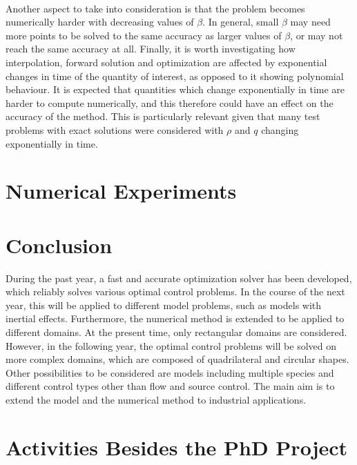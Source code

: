 \documentclass[11pt, a4paper]{article}
\theoremstyle{definition}
\newcommand{\adj}{q}
\begin{document}
\\
Another aspect to take into consideration is that the problem becomes numerically harder with decreasing values of $\beta$. In general, small $\beta$ may need more points to be solved to the same accuracy as larger values of $\beta$, or may not reach the same accuracy at all.  Finally, it is worth investigating how interpolation, forward solution and optimization are affected by exponential changes in time of the quantity of interest, as opposed to it showing polynomial behaviour. It is expected that quantities which change exponentially in time are harder to compute numerically, and this therefore could have an effect on the accuracy of the method. This is particularly relevant given that many test problems with exact solutions were considered with $\rho$ and $\adj$ changing exponentially in time.


\section{Numerical Experiments} \label{sec:Examples}



\section{Conclusion}
During the past year, a fast and accurate optimization solver has been developed, which reliably solves various optimal control problems. In the course of the next year, this will be applied to different model problems, such as models with inertial effects. Furthermore, the numerical method is extended to be applied to different domains. At the present time, only rectangular domains are considered. However, in the following year, the optimal control problems will be solved on more complex domains, which are composed of quadrilateral and circular shapes. 
Other possibilities to be considered are models including multiple species and different control types other than flow and source control.
The main aim is to extend the model and the numerical method to industrial applications.


\pagebreak	



\pagebreak
\appendix

\section{Activities Besides the PhD Project}
\end{document}
